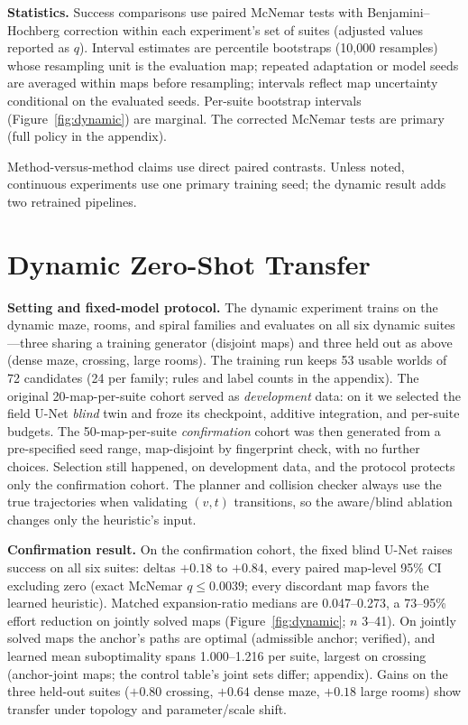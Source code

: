 \documentclass[letterpaper]{article} %
\begin{document}
\textbf{Statistics.}  Success comparisons use paired McNemar tests with Benjamini--Hochberg correction within each experiment's set of suites (adjusted values reported as $q$). Interval estimates are percentile bootstraps (10{,}000 resamples) whose resampling unit is the evaluation map; repeated adaptation or model seeds are averaged within maps before resampling; intervals reflect map uncertainty conditional on the evaluated seeds. Per-suite bootstrap intervals (Figure~\ref{fig:dynamic}) are marginal. The corrected McNemar tests are primary (full policy in the appendix).

Method-versus-method claims use direct paired contrasts. Unless noted, continuous experiments use one primary training seed; the dynamic result adds two retrained pipelines.

\section{Dynamic Zero-Shot Transfer}

\textbf{Setting and fixed-model protocol.} The dynamic experiment trains on the dynamic maze, rooms, and spiral families and evaluates on all six dynamic suites---three sharing a training generator (disjoint maps) and three held out as above (dense maze, crossing, large rooms). The training run keeps 53 usable worlds of 72 candidates (24 per family; rules and label counts in the appendix). The original 20-map-per-suite cohort served as \emph{development} data: on it we selected the field U-Net \emph{blind} twin and froze its checkpoint, additive integration, and per-suite budgets. The 50-map-per-suite \emph{confirmation} cohort was then generated from a pre-specified seed range, map-disjoint by fingerprint check, with no further choices. Selection still happened, on development data, and the protocol protects only the confirmation cohort. The planner and collision checker always use the true trajectories when validating $(v,t)$ transitions, so the aware/blind ablation changes only the heuristic's input.

\textbf{Confirmation result.} On the confirmation cohort, the fixed blind U-Net raises success on all six suites: deltas $+0.18$ to $+0.84$, every paired map-level 95\% CI excluding zero (exact McNemar $q \leq 0.0039$; every discordant map favors the learned heuristic). Matched expansion-ratio medians are 0.047--0.273, a 73--95\% effort reduction on jointly solved maps (Figure~\ref{fig:dynamic}; $n$ 3--41). On jointly solved maps the anchor's paths are optimal (admissible anchor; verified), and learned mean suboptimality spans 1.000--1.216 per suite, largest on crossing (anchor-joint maps; the control table's joint sets differ; appendix). Gains on the three held-out suites ($+0.80$ crossing, $+0.64$ dense maze, $+0.18$ large rooms) show transfer under topology and parameter/scale shift.
\end{document}
